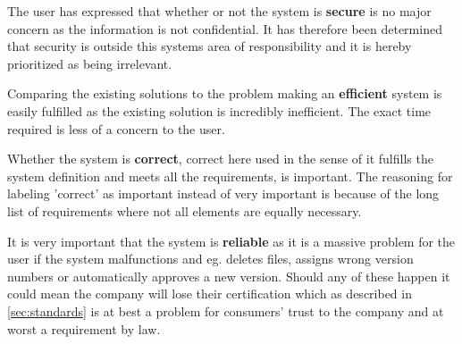 The user has expressed that whether or not the system is \textbf{secure} is no major concern as the information is not confidential.
It has therefore been determined that security is outside this systems area of responsibility and it is hereby prioritized as being irrelevant.

Comparing the existing solutions to the problem making an \textbf{efficient} system is easily fulfilled as the existing solution is incredibly inefficient. 
The exact time required is less of a concern to the user.

Whether the system is \textbf{correct}, correct here used in the sense of it fulfills the system definition and meets all the requirements, is important. 
The reasoning for labeling 'correct' as important instead of very important is because of the long list of requirements where not all elements are equally necessary.

It is very important that the system is \textbf{reliable} as it is a massive problem for the user if the system malfunctions and eg. deletes files, assigns wrong version numbers or automatically approves a new version. 
Should any of these happen it could mean the company will lose their certification which as described in \cref{sec:standards} is at best a problem for consumers' trust to the company and at worst a requirement by law.

